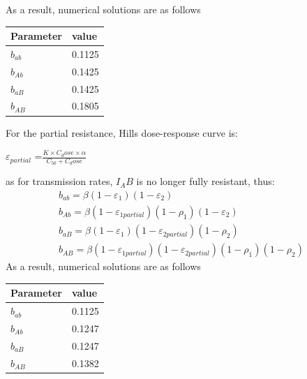 \documentclass{report}
\begin{document}
As a result, numerical solutions are as follows
\begin{center}
    \label{tab:transmission rates}
    \begin{tabular}{ll}
        \toprule
        \textbf{Parameter} & \textbf{value}\\
        \midrule
        $b_{ab}$ & 0.1125\\
        $b_{Ab}$ & 0.1425\\
        $b_{aB}$ & 0.1425\\
        $b_{AB}$ & 0.1805\\
        \bottomrule
    \end{tabular}
\end{center}

\noindent For the partial resistance, Hills dose-response curve is:
\begin{center}
    $\varepsilon_{partial}$ =$\frac{K \times C_dose \times \alpha}{C_{50}+C_dose}$
\end{center}
as for transmission rates, $I_AB$ is no longer fully resistant, thus:
\begin{align}
    b_{ab}=\beta(1-\varepsilon_1)(1-\varepsilon_2)\\
    b_{Ab}=\beta(1-\varepsilon_{1partial})(1-\rho_1)(1-\varepsilon_2)\\
    b_{aB}=\beta(1-\varepsilon_1)(1-\varepsilon_{2partial})(1-\rho_2)\\
    b_{AB}=\beta(1-\varepsilon_{1partial})(1-\varepsilon_{2partial})(1-\rho_1)(1-\rho_2)
\end{align}
As a result, numerical solutions are as follows
\begin{center}
    \label{tab:transmission rates partial resistance}
    \begin{tabular}{ll}
        \toprule
        \textbf{Parameter} & \textbf{value}\\
        \midrule
        $b_{ab}$ & 0.1125\\
        $b_{Ab}$ & 0.1247\\
        $b_{aB}$ & 0.1247\\
        $b_{AB}$ & 0.1382\\
        \bottomrule
    \end{tabular}
\end{center}
\end{document}
